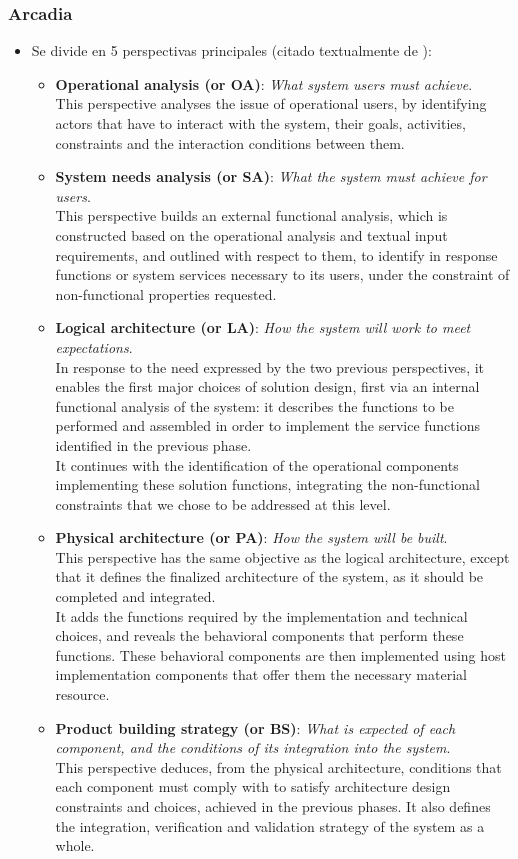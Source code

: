 \subsubsection{Arcadia}\label{sec:arcadia}
\begin{itemize}
	\item Se divide en 5 perspectivas principales (citado textualmente de \cite[p15]{voirin_model-based_2018}):
	\begin{itemize}
		\item \textbf{Operational analysis (or OA)}: 
			\emph{What system users must achieve}. \\
			This perspective analyses the issue of operational users, by identifying actors that have to interact with the system, their goals, activities, constraints and the interaction conditions between them. 
		\item \textbf{System needs analysis (or SA)}: 
			\emph{What the system must achieve for users}. \\
			This perspective builds an external functional analysis, which is constructed based on the operational analysis and textual input requirements, and outlined with respect to them, to identify in response functions or system services necessary to its users, under the constraint of non-functional properties requested.
		\item \textbf{Logical architecture (or LA)}: 
			\emph{How the system will work to meet expectations}. \\
			In response to the need expressed by the two previous perspectives, it enables the first major choices of solution design, first via an internal functional analysis of the system: it describes the functions to be performed and assembled in order to implement the service functions identified in the previous phase. \\
			It continues with the identification of the operational components implementing these solution functions, integrating the non-functional constraints that we chose to be addressed at this level.
		\item \textbf{Physical architecture (or PA)}: 
			\emph{How the system will be built}. \\
			This perspective has the same objective as the logical architecture, except that it defines the finalized architecture of the system, as it should be completed and integrated. \\
			It adds the functions required by the implementation and technical choices, and reveals the behavioral components that perform these functions. These behavioral components are then implemented using host implementation components that offer them the necessary material resource.
		\item \textbf{Product building strategy (or BS)}: 
			\emph{What is expected of each component, and the conditions of its integration into the system}. \\
			This perspective deduces, from the physical architecture, conditions that each component must comply with to satisfy architecture design constraints and choices, achieved in the previous phases. It also defines the integration, verification and validation strategy of the system as a whole.
		

\end{itemize}
\end{itemize}
